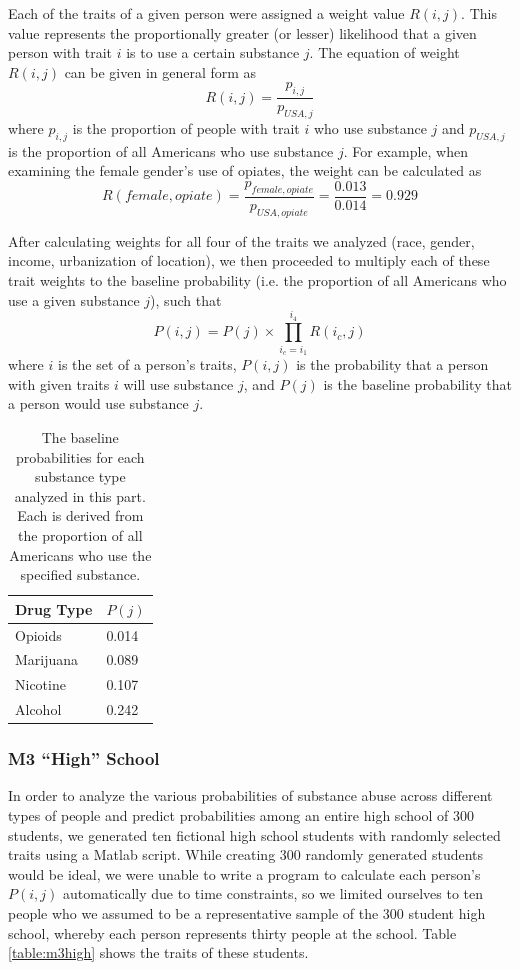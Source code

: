 \documentclass[12pt]{article}
\begin{document}
Each of the traits of a given person were assigned a weight value $R(i,j)$. This value represents the proportionally greater (or lesser) likelihood that a given person with trait $i$ is to use a certain substance $j$. The equation of weight $R(i,j)$ can be given in general form as
\begin{equation}
    R(i,j) = \frac{p_{i,j}}{p_{USA,j}}
\end{equation}
where $p_{i,j}$ is the proportion of people with trait $i$ who use substance $j$ and $p_{USA,j}$ is the proportion of all Americans who use substance $j$. For example, when examining the female gender's use of opiates, the weight can be calculated as
\begin{equation}
    R(female,opiate) = \frac{p_{female,opiate}}{p_{USA,opiate}} = \frac{0.013}{0.014} = 0.929
\end{equation}

After calculating weights for all four of the traits we analyzed (race, gender, income, urbanization of location), we then proceeded to multiply each of these trait weights to the baseline probability (i.e. the proportion of all Americans who use a given substance $j$), such that
\begin{equation}
    P(i,j) = P(j) \times \prod_{i_c=i_1}^{i_4} R(i_c,j)
\end{equation}
where $i$ is the set of a person's traits, $P(i,j)$ is the probability that a person with given traits $i$ will use substance $j$, and $P(j)$ is the baseline probability that a person would use substance $j$.

\begin{table}[]
\begin{tabular}{@{}ll@{}}
\toprule
Drug Type & $P(j)$ \\ \midrule
Opioids   & 0.014  \\
Marijuana & 0.089  \\
Nicotine  & 0.107 \\
Alcohol   & 0.242 \\ \bottomrule
\end{tabular}
\caption{The baseline probabilities for each substance type analyzed in this part. Each is derived from the proportion of all Americans who use the specified substance.}
\end{table}

\subsubsection{M3 ``High'' School}
In order to analyze the various probabilities of substance abuse across different types of people and predict probabilities among an entire high school of 300 students, we generated ten fictional high school students with randomly selected traits using a Matlab script. While creating 300 randomly generated students would be ideal, we were unable to write a program to calculate each person's $P(i,j)$ automatically due to time constraints, so we limited ourselves to ten people who we assumed to be a representative sample of the 300 student high school, whereby each person represents thirty people at the school. Table \ref{table:m3high} shows the traits of these students.
\end{document}
